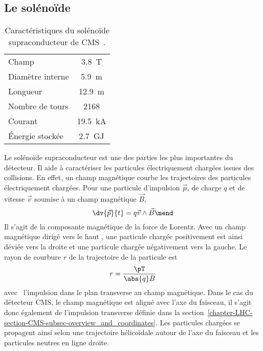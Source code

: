 \subsection{Le solénoïde}\label{chapter-LHC-section-CMS-subsec-solenoide}
\begin{wraptable}{R}{6.25cm}
\centering
\vspace{-\baselineskip}
\begin{tabular}{lc}
\toprule
Champ & \SI{3.8}{\tesla}\\
Diamètre interne & \SI{5.9}{\meter}\\
Longueur & \SI{12.9}{\meter}\\
Nombre de tours & \num{2168}\\
Courant & \SI{19.5}{\kilo\ampere}\\
Énergie stockée & \SI{2.7}{\giga\joule}\\
\bottomrule
\end{tabular}
\caption[Caractéristiques du solénoïde supraconducteur de CMS.]{Caractéristiques du solénoïde supraconducteur de CMS~\cite{CMS_TDR_1}.}
\label{tab-solenoid_properties}
\vspace{\baselineskip}
\end{wraptable}
Le solénoïde supraconducteur est une des parties les plus importantes du détecteur.
Il aide à caractériser les particules électriquement chargées issues des collisions.
En effet, un champ magnétique courbe les trajectoires des particules électriquement chargées.
Pour une particule d'impulsion $\vec{p}$, de charge $q$ et de vitesse $\vec{v}$ soumise à un champ magnétique $\vec{B}$,
\begin{equation}
\dv{\vec{p}}{t} = q \vec{v} \wedge \vec{B}
\mend
\end{equation}
Il s'agit de la composante magnétique de la force de Lorentz.
Avec un champ magnétique dirigé \og vers le haut \fg, une particule chargée positivement est ainsi déviée vers la droite et une particule chargée négativement vers la gauche.
Le rayon de courbure $r$ de la trajectoire de la particule est
\begin{equation}
r = \frac{\pT}{\abs{q}B}
\label{eq-chapter-LHC-section-CMS-subsec-solenoide-rayon_courbure}
\end{equation}
avec \pT\ l'impulsion dans le plan transverse au champ magnétique.
Dans le cas du détecteur CMS, le champ magnétique est aligné avec l'axe du faisceau, il s'agit donc également de l'impulsion transverse définie dans la section~\ref{chapter-LHC-section-CMS-subsec-overview_and_coordinates}.
Les particules chargées se propagent ainsi selon une trajectoire hélicoïdale autour de l'axe du faisceau et les particules neutres en ligne droite.
